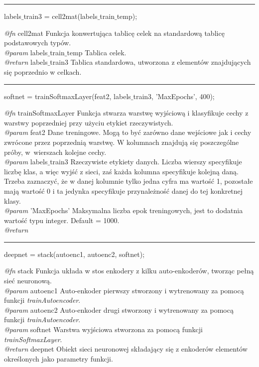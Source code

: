 \vspace{1cm}
\hrule
\vspace{1cm}

\noindent labels$\_$train3 = cell2mat(labels$\_$train$\_$temp);
\vspace{1cm}

\noindent \textit{@fn} cell2mat Funkcja konwertująca tablicę celek na standardową tablicę podstawowych typów.
\\ \textit{@param} labels$\_$train$\_$temp Tablica celek.
\\ \textit{@return} labels$\_$train3 Tablica standardowa, utworzona z elementów znajdujących się poprzednio w celkach.

\vspace{1cm}
\hrule
\vspace{1cm}

\noindent softnet = trainSoftmaxLayer(feat2, labels$\_$train3, 'MaxEpochs', 400);
\vspace{1cm}

\noindent \textit{@fn} trainSoftmaxLayer Funkcja stwarza warstwę wyjściową i klasyfikuje cechy z warstwy poprzedniej przy użyciu etykiet rzeczywistych.
\\ \textit{@param} feat2 Dane treningowe. Mogą to być zarówno dane wejściowe jak i cechy zwrócone przez poprzednią warstwę. W kolumnach znajdują się poszczególne próby, w~wierszach kolejne cechy.
\\ \textit{@param} labels$\_$train3 Rzeczywiste etykiety danych. Liczba wierszy specyfikuje liczbę klas, a więc wyjść z sieci, zaś każda kolumna specyfikuje kolejną daną. Trzeba zaznaczyć, że w danej kolumnie tylko jedna cyfra ma wartość 1, pozostałe mają wartość 0 i ta jedynka specyfikuje przynależność danej do tej konkretnej klasy. 
\\ \textit{@param} 'MaxEpochs' Maksymalna liczba epok treningowych, jest to dodatnia wartość typu integer. Default = 1000.
\\ \textit{@return} 

\vspace{1cm}
\hrule
\vspace{1cm}

\noindent deepnet = stack(autoenc1, autoenc2, softnet);
\vspace{1cm}

\noindent \textit{@fn} stack Funkcja układa w stos enkodery z kilku auto-enkoderów, tworząc pełną sieć neuronową.
\\ \textit{@param} autoenc1 Auto-enkoder pierwszy stworzony i wytrenowany za pomocą funkcji \textit{trainAutoencoder}.
\\ \textit{@param} autoenc2 Auto-enkoder drugi stworzony i wytrenowany za pomocą funkcji \textit{trainAutoencoder}.
\\ \textit{@param} softnet Warstwa wyjściowa stworzona za pomocą funkcji \textit{trainSoftmaxLayer}.
\\ \textit{@return} deepnet Obiekt sieci neuronowej składający się z enkoderów elementów określonych jako parametry funkcji.

